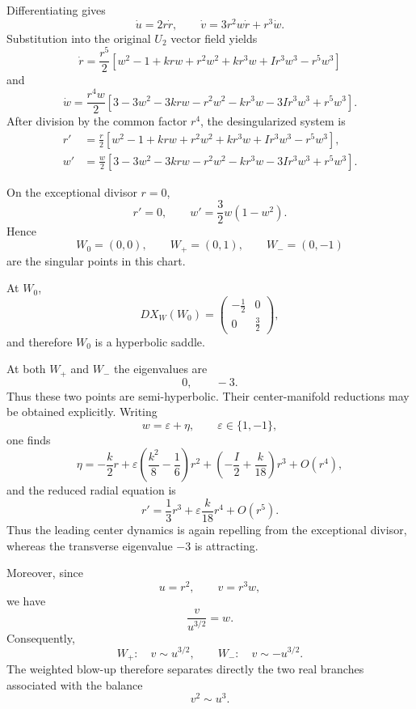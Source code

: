 \documentclass[11pt,reqno]{amsart}
\theoremstyle{plain}
\theoremstyle{definition}
\theoremstyle{remark}
\begin{document}
Differentiating gives
\[
\dot u=2r\dot r,
\qquad
\dot v=3r^2w\dot r+r^3\dot w.
\]
Substitution into the original $U_2$ vector field yields
\[
\dot r
=
\frac{r^5}{2}
\left[
w^2-1
+krw
+r^2w^2
+kr^3w
+Ir^3w^3
-r^5w^3
\right]
\]
and
\[
\dot w
=
\frac{r^4w}{2}
\left[
3-3w^2
-3krw
-r^2w^2
-kr^3w
-3Ir^3w^3
+r^5w^3
\right].
\]
After division by the common factor $r^4$, the desingularized system
is
\begin{equation}
\label{eq:weighted-desing}
\boxed{
\begin{aligned}
r'
&=
\frac{r}{2}
\left[
w^2-1
+krw
+r^2w^2
+kr^3w
+Ir^3w^3
-r^5w^3
\right],
\\
w'
&=
\frac{w}{2}
\left[
3-3w^2
-3krw
-r^2w^2
-kr^3w
-3Ir^3w^3
+r^5w^3
\right].
\end{aligned}}
\end{equation}

On the exceptional divisor $r=0$,
\[
r'=0,
\qquad
w'=\frac32w(1-w^2).
\]
Hence
\[
W_0=(0,0),
\qquad
W_+=(0,1),
\qquad
W_-=(0,-1)
\]
are the singular points in this chart.

At $W_0$,
\[
D X_W(W_0)
=
\begin{pmatrix}
-\frac12&0\\
0&\frac32
\end{pmatrix},
\]
and therefore $W_0$ is a hyperbolic saddle.

At both $W_+$ and $W_-$ the eigenvalues are
\[
0,\qquad -3.
\]
Thus these two points are semi-hyperbolic. Their center-manifold
reductions may be obtained explicitly. Writing
\[
w=\varepsilon+\eta,
\qquad
\varepsilon\in\{1,-1\},
\]
one finds
\[
\eta
=
-\frac{k}{2}r
+
\varepsilon
\left(
\frac{k^2}{8}-\frac16
\right)r^2
+
\left(
-\frac I2+\frac{k}{18}
\right)r^3
+
O(r^4),
\]
and the reduced radial equation is
\begin{equation}
\label{eq:weighted-reduced}
\boxed{
r'
=
\frac13r^3
+
\varepsilon\frac{k}{18}r^4
+
O(r^5).
}
\end{equation}
Thus the leading center dynamics is again repelling from the
exceptional divisor, whereas the transverse eigenvalue $-3$ is
attracting.

Moreover, since
\[
u=r^2,
\qquad
v=r^3w,
\]
we have
\[
\frac{v}{u^{3/2}}=w.
\]
Consequently,
\[
W_+:\quad v\sim u^{3/2},
\qquad
W_-:\quad v\sim -u^{3/2}.
\]
The weighted blow-up therefore separates directly the two real
branches associated with the balance
\[
v^2\sim u^3.
\]
\end{document}
